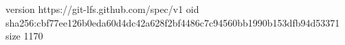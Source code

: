 version https://git-lfs.github.com/spec/v1
oid sha256:cbf77ee126b0eda60d4dc42a628f2bf4486c7c94560bb1990b153dfb94d53371
size 1170
